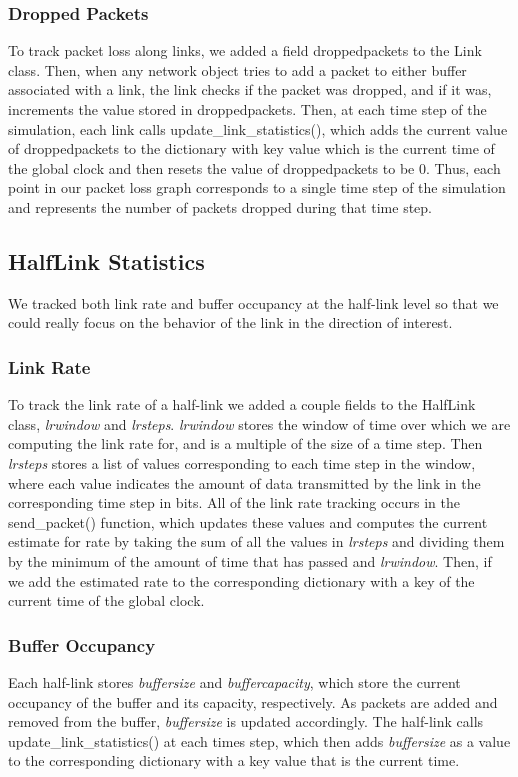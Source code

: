 \documentclass{article}
\begin{document}
\subsubsection{Dropped Packets}
To track packet loss along links, we added a field droppedpackets to the Link class. Then, when any network object tries to add a packet to either buffer associated with a link, the link checks if the packet was dropped, and if it was, increments the value stored in droppedpackets. Then, at each time step of the simulation, each link calls update\_link\_statistics(), which adds the current value of droppedpackets to the dictionary with key value which is the current time of the global clock and then resets the value of droppedpackets to be 0. Thus, each point in our packet loss graph corresponds to a single time step of the simulation and represents the number of packets dropped during that time step. 

\subsection{HalfLink Statistics}
We tracked both link rate and buffer occupancy at the half-link level so that we could really focus on the behavior of the link in the direction of interest. 

\subsubsection{Link Rate}
To track the link rate of a half-link we added a couple fields to the HalfLink class, {\em lrwindow} and {\em lrsteps}. {\em lrwindow} stores the window of time over which we are computing the link rate for, and is a multiple of the size of a time step. Then {\em lrsteps} stores a list of values corresponding to each time step in the window, where each value indicates the amount of data transmitted by the link in the corresponding time step in bits. All of the link rate tracking occurs in the  send\_packet() function, which updates these values and computes the current estimate for rate by taking the sum of all the values in {\em lrsteps} and dividing them by the minimum of the amount of time that has passed and {\em lrwindow}. Then, if we add the estimated rate to the corresponding dictionary with a key of the current time of the global clock. 

\subsubsection{Buffer Occupancy}
Each half-link stores {\em buffersize} and {\em buffercapacity}, which store the current occupancy of the buffer and its capacity, respectively. As packets are added and removed from the buffer, {\em buffersize} is updated accordingly. The half-link calls update\_link\_statistics() at each times step, which then adds {\em buffersize} as a value to the corresponding dictionary with a key value that is the current time. 
\end{document}
